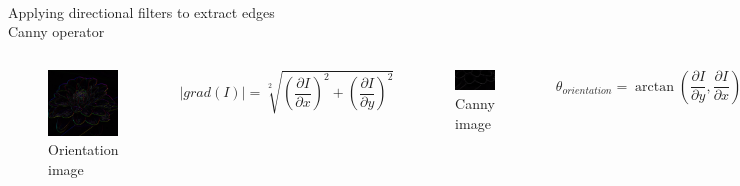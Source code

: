 \documentclass[accentcolor=tud4b,colorbacktitle,inverttitle,landscape,german,presentation,t]{tudbeamer}
\begin{document}
\begin{frame}{\\Applying directional filters to extract edges\\ \small{Canny operator}}
\begin{columns}

\vspace{-1cm}
\begin{figure}
\includegraphics[scale=.5]{Sobel_3}
\caption{Orientation image \cite{youtube} }
\end{figure}
$$|grad(I)|=\sqrt[2]{\left(\frac{\partial I}{\partial x}\right)^2+\left(\frac{\partial I}{\partial y}\right)^2}$$

\vspace{-.15cm}
\begin{figure}
\includegraphics[scale=.35]{Canny_2}
\caption{Canny image }
\end{figure}

$$\theta_{orientation}=\arctan{\left(\frac{\partial I}{\partial y},\frac{\partial I}{\partial x}\right)}$$

\end{columns}
\end{frame}
\end{document}
